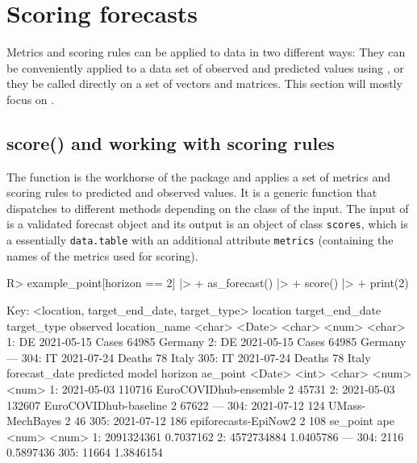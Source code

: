 \documentclass[
]{jss}
\begin{document}
\section{Scoring forecasts} \label{sec:scoring}

Metrics and scoring rules can be applied to data in two different ways:
They can be conveniently applied to a data set of observed and predicted
values using , or they be called directly on a set of
vectors and matrices. This section will mostly focus on .

\subsection{score() and working with scoring
rules}\label{score-and-working-with-scoring-rules}

The function  is the workhorse of the package and applies
a set of metrics and scoring rules to predicted and observed values. It
is a generic function that dispatches to different methods depending on
the class of the input. The input of  is a validated
forecast object and its output is an object of class \texttt{scores},
which is a essentially \texttt{data.table} with an additional attribute
\texttt{metrics} (containing the names of the metrics used for scoring).

\begin{CodeChunk}
\begin{CodeInput}
R> example_point[horizon == 2] |>
+   as_forecast() |>
+   score() |>
+   print(2)
\end{CodeInput}
\begin{CodeOutput}
Key: <location, target_end_date, target_type>
     location target_end_date target_type observed location_name
       <char>          <Date>      <char>    <num>        <char>
  1:       DE      2021-05-15       Cases    64985       Germany
  2:       DE      2021-05-15       Cases    64985       Germany
 ---                                                            
304:       IT      2021-07-24      Deaths       78         Italy
305:       IT      2021-07-24      Deaths       78         Italy
     forecast_date predicted                 model horizon ae_point
            <Date>     <int>                <char>   <num>    <num>
  1:    2021-05-03    110716 EuroCOVIDhub-ensemble       2    45731
  2:    2021-05-03    132607 EuroCOVIDhub-baseline       2    67622
 ---                                                               
304:    2021-07-12       124       UMass-MechBayes       2       46
305:    2021-07-12       186  epiforecasts-EpiNow2       2      108
       se_point       ape
          <num>     <num>
  1: 2091324361 0.7037162
  2: 4572734884 1.0405786
 ---                     
304:       2116 0.5897436
305:      11664 1.3846154
\end{CodeOutput}
\end{CodeChunk}
\end{document}
